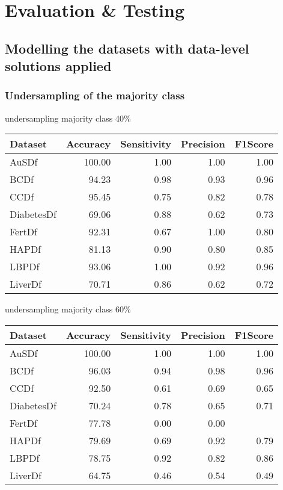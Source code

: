 \chapter{Evaluation \& Testing}\label{ch:Evaluation}

\section{Modelling the datasets with data-level solutions applied}
\subsection{Undersampling of the majority class}
undersampling majority class 40\%
\begin{table}[ht]
\centering
\begin{tabular}{lrrrr}
  \hline
Dataset & Accuracy & Sensitivity & Precision & F1Score \\ 
  \hline
AuSDf & 100.00 & 1.00 & 1.00 & 1.00 \\ 
  BCDf & 94.23 & 0.98 & 0.93 & 0.96 \\ 
  CCDf & 95.45 & 0.75 & 0.82 & 0.78 \\ 
  DiabetesDf & 69.06 & 0.88 & 0.62 & 0.73 \\ 
  FertDf & 92.31 & 0.67 & 1.00 & 0.80 \\ 
  HAPDf & 81.13 & 0.90 & 0.80 & 0.85 \\ 
  LBPDf & 93.06 & 1.00 & 0.92 & 0.96 \\ 
  LiverDf & 70.71 & 0.86 & 0.62 & 0.72 \\ 
   \hline
\end{tabular}
\end{table}

undersampling majority class 60\%
\begin{table}[ht]
\centering
\begin{tabular}{lrrrr}
  \hline
Dataset & Accuracy & Sensitivity & Precision & F1Score \\ 
  \hline
AuSDf & 100.00 & 1.00 & 1.00 & 1.00 \\ 
  BCDf & 96.03 & 0.94 & 0.98 & 0.96 \\ 
  CCDf & 92.50 & 0.61 & 0.69 & 0.65 \\ 
  DiabetesDf & 70.24 & 0.78 & 0.65 & 0.71 \\ 
  FertDf & 77.78 & 0.00 & 0.00 &  \\ 
  HAPDf & 79.69 & 0.69 & 0.92 & 0.79 \\ 
  LBPDf & 78.75 & 0.92 & 0.82 & 0.86 \\ 
  LiverDf & 64.75 & 0.46 & 0.54 & 0.49 \\ 
   \hline
\end{tabular}
\end{table}

